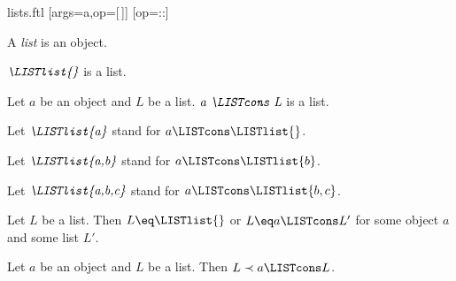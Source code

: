 \documentclass{naproche-library}
\begin{document}
\begin{smodule}[title=Lists]{lists.ftl}
[args=a,op=[\,]]{}
[op=::]{\mathbin{\highlight{::}}}


\begin{signature}[forthel,id=LISTS_LISTS_4578620297183232]
  A \emph{list} is an object.
\end{signature}

\begin{signature}[forthel,id=LISTS_LISTS_3703161885818880]
  $\emph{\LISTlist{}}$ is a list.
\end{signature}

\begin{signature}[forthel,id=LISTS_LISTS_8050301789536256]
  Let $a$ be an object and $L$ be a list.
  $\emph{a \LISTcons L}$ is a list.

  Let $\emph{\LISTlist{a}}$ stand for $a \LISTcons \LISTlist{}$.
  
  Let $\emph{\LISTlist{a,b}}$ stand for $a \LISTcons \LISTlist{b}$.
  
  Let $\emph{\LISTlist{a,b,c}}$ stand for $a \LISTcons \LISTlist{b,c}$.
\end{signature}

\begin{axiom}[forthel,id=LISTS_LISTS_4512036658964875]
  Let $L$ be a list.
  Then $L \eq \LISTlist{}$ or $L \eq a \LISTcons L'$ for some object $a$ and some list $L'$.
\end{axiom}

\begin{axiom}[forthel,id=LISTS_LISTS_1021563255448756]
  Let $a$ be an object and $L$ be a list.
  Then $L \prec a \LISTcons L$.
\end{axiom}
\end{smodule}
\end{document}

